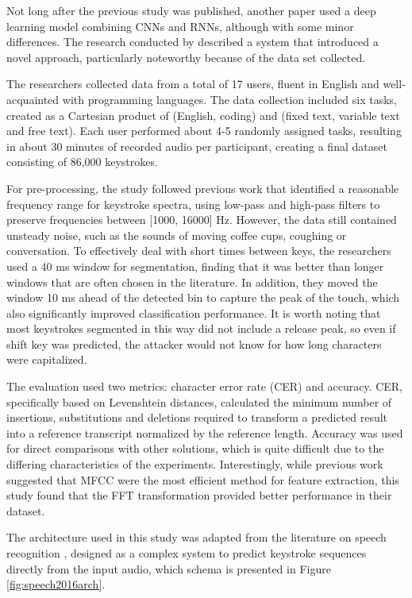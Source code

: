 \documentclass[a4paper,11pt,twoside]{report}
\theoremstyle{definition}
\begin{document}
Not long after the previous study was published, another paper used a deep learning model combining CNNs and RNNs, although with some minor differences. The research conducted by \textit{\cite{rnn2019}} described a system that introduced a novel approach, particularly noteworthy because of the data set collected.

The researchers collected data from a total of 17 users, fluent in English and well-acquainted with programming languages. The data collection included six tasks, created as a Cartesian product of (English, coding) and (fixed text, variable text and free text). Each user performed about 4-5 randomly assigned tasks, resulting in about 30 minutes of recorded audio per participant, creating a final dataset consisting of 86,000 keystrokes.

For pre-processing, the study followed previous work that identified a reasonable frequency range for keystroke spectra, using low-pass and high-pass filters to preserve frequencies between [1000, 16000] Hz. However, the data still contained unsteady noise, such as the sounds of moving coffee cups, coughing or conversation. To effectively deal with short times between keys, the researchers used a 40 ms window for segmentation, finding that it was better than longer windows that are often chosen in the literature. In addition, they moved the window 10 ms ahead of the detected bin to capture the peak of the touch, which also significantly improved classification performance. It is worth noting that most keystrokes segmented in this way did not include a release peak, so even if shift key was predicted, the attacker would not know for how long characters were capitalized.

The evaluation used two metrics: character error rate (CER) and accuracy. CER, specifically based on Levenshtein distances, calculated the minimum number of insertions, substitutions and deletions required to transform a predicted result into a reference transcript normalized by the reference length. Accuracy was used for direct comparisons with other solutions, which is quite difficult due to the differing characteristics of the experiments. Interestingly, while previous work suggested that MFCC were the most efficient method for feature extraction, this study found that the FFT transformation provided better performance in their dataset.

The architecture used in this study was adapted from the literature on speech recognition \cite{speech2016}, designed as a complex system to predict keystroke sequences directly from the input audio, which schema is presented in Figure \ref{fig:speech2016arch}.
\end{document}
